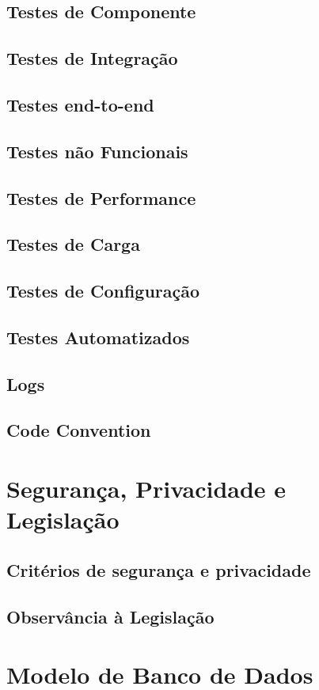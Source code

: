 \documentclass[
12pt,				%
openany,			%
oneside,			%
a4paper,			%
english,			%
french,				%
spanish,			%
brazil				%
]{abntex2}
\begin{document}
	\subsection{Testes de Componente}
	\subsection{Testes de Integração}
	\subsection{Testes end-to-end}
	\subsection{Testes não Funcionais}
	\subsection{Testes de Performance}
	\subsection{Testes de Carga}
	\subsection{Testes de Configuração}
	\subsection{Testes Automatizados}
	\subsection{Logs}
	\subsection{Code Convention}
	\section{Segurança, Privacidade e Legislação}
	\subsection{Critérios de segurança e privacidade}
	\subsection{Observância à Legislação}
	\section{Modelo de Banco de Dados}
\end{document}

